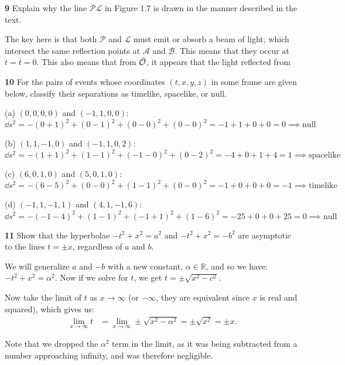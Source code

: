 \documentclass[gr-notes.tex]{subfiles}
\begin{document}
\textbf{9}
Explain why the line $\mathcal{P}\mathcal{L}$ in Figure 1.7 is drawn in the manner described in the text.

The key here is that both $\mathcal{P}$ and $\mathcal{L}$ must emit or absorb a beam of light, which intersect the same reflection points at $\mathcal{A}$ and $\mathcal{B}$. This means that they occur at $t = \bar{t} = 0$. This also means that from $\bar{\mathcal{O}}$, it appears that the light reflected from



\textbf{10}
For the pairs of events whose coordinates $(t,x,y,z)$ in some frame are given below, classify their separations as timelike, spacelike, or null.

(a) $(0,0,0,0)$ and $(-1,1,0,0)$:
\begin{displaymath}
  \dd{s}^2 =
  -(0 + 1)^2 + (0 - 1)^2 + (0 - 0)^2 + (0 - 0)^2 =
  -1 + 1 + 0 + 0 =
  0 \implies
  \mathrm{null}
\end{displaymath}

(b) $(1,1,-1,0)$ and $(-1,1,0,2)$:
\begin{displaymath}
  \dd{s}^2 =
  -(1 + 1)^2 + (1 - 1)^2 + (-1 - 0)^2 + (0 - 2)^2 =
  -4 + 0 + 1 + 4 =
  1 \implies
  \mathrm{spacelike}
\end{displaymath}

(c) $(6,0,1,0)$ and $(5,0,1,0)$:
\begin{displaymath}
  \dd{s}^2 =
  -(6 - 5)^2 + (0 - 0)^2 + (1 - 1)^2 + (0 - 0)^2 =
  -1 + 0 + 0 + 0 =
  -1 \implies
  \mathrm{timelike}
\end{displaymath}

(d) $(-1,1,-1,1)$ and $(4,1,-1,6)$:
\begin{displaymath}
  \dd{s}^2 =
  -(-1 - 4)^2 + (1 - 1)^2 + (-1 + 1)^2 + (1 - 6)^2 =
  -25 + 0 + 0 + 25 =
  0 \implies
  \mathrm{null}
\end{displaymath}


\textbf{11}
Show that the hyperbolae $-t^2 + x^2 = a^2$ and $-t^2 + x^2 = -b^2$ are asymptotic to the lines $t = \pm x$, regardless of $a$ and $b$.

We will generalize $a$ and $-b$ with a new constant, $\alpha \in \mathbb{R}$, and so we have: $-t^2 + x^2 = \alpha^2$. Now if we solve for $t$, we get $t = \pm \sqrt{x^2 - c^2}$.

Now take the limit of $t$ as $x \to \infty$ (or $-\infty$, they are equivalent since $x$ is real and squared), which gives us:
\begin{align*}
  \lim_{x\to\infty} t &=
  \lim_{x\to\infty} \pm \sqrt{x^2 - \alpha^2} =
  \pm \sqrt{x^2} = \pm x.
\end{align*}

Note that we dropped the $\alpha^2$ term in the limit, as it was being subtracted from a number approaching infinity, and was therefore negligible.
\end{document}
